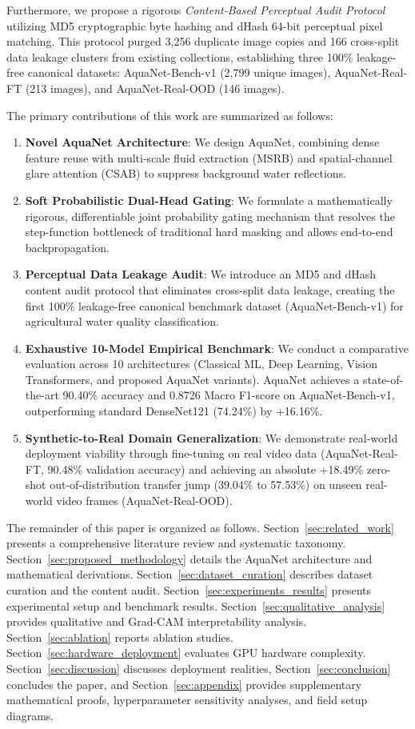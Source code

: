\documentclass[journal]{IEEEtran}
\newcommand{\method}{AquaNet}
\newcommand{\datasetbench}{AquaNet-Bench-v1}
\newcommand{\datasetrealft}{AquaNet-Real-FT}
\newcommand{\datasetrealood}{AquaNet-Real-OOD}
\begin{document}
Furthermore, we propose a rigorous \emph{Content-Based Perceptual Audit Protocol} utilizing MD5 cryptographic byte hashing and dHash 64-bit perceptual pixel matching. This protocol purged 3,256 duplicate image copies and 166 cross-split data leakage clusters from existing collections, establishing three 100\% leakage-free canonical datasets: \datasetbench{} (2,799 unique images), \datasetrealft{} (213 images), and \datasetrealood{} (146 images).

The primary contributions of this work are summarized as follows:
\begin{enumerate}
    \item \textbf{Novel \method{} Architecture}: We design \method{}, combining dense feature reuse with multi-scale fluid extraction (MSRB) and spatial-channel glare attention (CSAB) to suppress background water reflections.
    \item \textbf{Soft Probabilistic Dual-Head Gating}: We formulate a mathematically rigorous, differentiable joint probability gating mechanism that resolves the step-function bottleneck of traditional hard masking and allows end-to-end backpropagation.
    \item \textbf{Perceptual Data Leakage Audit}: We introduce an MD5 and dHash content audit protocol that eliminates cross-split data leakage, creating the first 100\% leakage-free canonical benchmark dataset (\datasetbench{}) for agricultural water quality classification.
    \item \textbf{Exhaustive 10-Model Empirical Benchmark}: We conduct a comparative evaluation across 10 architectures (Classical ML, Deep Learning, Vision Transformers, and proposed AquaNet variants). \method{} achieves a state-of-the-art 90.40\% accuracy and 0.8726 Macro F1-score on \datasetbench{}, outperforming standard DenseNet121 (74.24\%) by +16.16\%.
    \item \textbf{Synthetic-to-Real Domain Generalization}: We demonstrate real-world deployment viability through fine-tuning on real video data (\datasetrealft{}, 90.48\% validation accuracy) and achieving an absolute +18.49\% zero-shot out-of-distribution transfer jump (39.04\% to 57.53\%) on unseen real-world video frames (\datasetrealood{}).
\end{enumerate}

The remainder of this paper is organized as follows. Section~\ref{sec:related_work} presents a comprehensive literature review and systematic taxonomy. Section~\ref{sec:proposed_methodology} details the \method{} architecture and mathematical derivations. Section~\ref{sec:dataset_curation} describes dataset curation and the content audit. Section~\ref{sec:experiments_results} presents experimental setup and benchmark results. Section~\ref{sec:qualitative_analysis} provides qualitative and Grad-CAM interpretability analysis. Section~\ref{sec:ablation} reports ablation studies. Section~\ref{sec:hardware_deployment} evaluates GPU hardware complexity. Section~\ref{sec:discussion} discusses deployment realities, Section~\ref{sec:conclusion} concludes the paper, and Section~\ref{sec:appendix} provides supplementary mathematical proofs, hyperparameter sensitivity analyses, and field setup diagrams.
\end{document}
